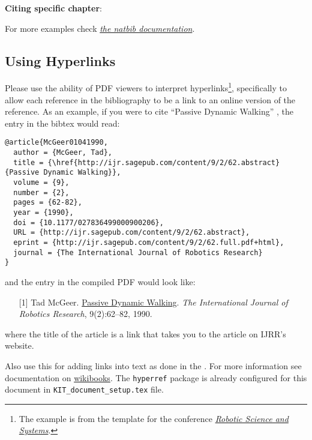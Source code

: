 \textbf{Citing specific chapter}:

\citet[sec. III]{Kroger2008MultiSensor}

\citep[sec. III]{Kroger2008MultiSensor}

For more examples check \href{http://merkel.texture.rocks/Latex/natbib.php}{\textit{the natbib documentation}}.

\subsection{Using Hyperlinks}
Please use the ability of PDF viewers to interpret hyperlinks\footnote{The example is from the template for the conference \href{http://www.roboticsconference.org/information/authorinfo/}{\textit{Robotic Science and Systems}}.}, specifically to allow each reference in the bibliography to be a
link to an online version of the reference.
As an example, if you were to cite ``Passive Dynamic Walking''
\cite{McGeer01041990}, the entry in the bibtex would read:

{\tiny
\begin{verbatim}
@article{McGeer01041990,
  author = {McGeer, Tad},
  title = {\href{http://ijr.sagepub.com/content/9/2/62.abstract}{Passive Dynamic Walking}},
  volume = {9},
  number = {2},
  pages = {62-82},
  year = {1990},
  doi = {10.1177/027836499000900206},
  URL = {http://ijr.sagepub.com/content/9/2/62.abstract},
  eprint = {http://ijr.sagepub.com/content/9/2/62.full.pdf+html},
  journal = {The International Journal of Robotics Research}
}
\end{verbatim}
}
\noindent
and the entry in the compiled PDF would look like:

\def\tmplabel#1{[#1]}

\begin{enumerate}
\item[\tmplabel{1}] Tad McGeer. \href{http://ijr.sagepub.com/content/9/2/62.abstract}{Passive Dynamic
Walking}. {\em The International Journal of Robotics Research}, 9(2):62--82,
1990.
\end{enumerate}
%
where the title of the article is a link that takes you to the article on IJRR's website.


Also use this for adding links into text as done in the \footnotemark[2]. For more information see documentation on \href{https://de.wikibooks.org/wiki/LaTeX-W%C3%B6rterbuch:_hyperref}{wikibooks}. The \texttt{hyperref} package is already configured for this document in \texttt{KIT\_document\_setup.tex} file.


